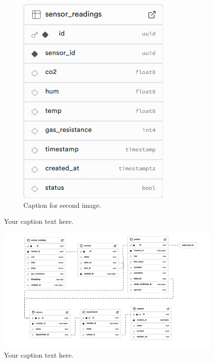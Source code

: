 \begin{inhalt}
\begin{figure}[!htb]
\begin{subfigure}[b]{0.45\textwidth}
    \includegraphics[width=\textwidth]{files/Thomas/pics/Datenbank_Design/sensor_readings.png}
    \caption{Caption for second image.}
    \label{fig:school2}
  \end{subfigure}
  \caption[Bildbezeichnung für Abbildungsverzeichnis]{Your caption text here.}
  \label{fig:gehaeuse_internet_bild}
\end{figure}


\newpage


\begin{figure}
  \centering
  \includegraphics[scale=0.45]{files/Thomas/pics/output.png}
  \caption[Bildbezeichnung für Abbildungsverzeichnis]{Your caption text here.}
  \label{fig:gehaeuse_internet_bild}
\end{figure}


\end{inhalt}
